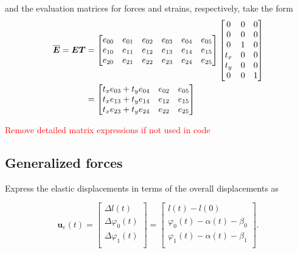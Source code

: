 and the evaluation matrices for forces and strains, respectively, take the form
%
\begin{align}
\overline{\boldsymbol{E}} = \boldsymbol{E}\boldsymbol{T} &=
\begin{bmatrix}
e_{00} & e_{01} & e_{02} & e_{03} & e_{04} & e_{05} \\
e_{10} & e_{11} & e_{12} & e_{13} & e_{14} & e_{15} \\
e_{20} & e_{21} & e_{22} & e_{23} & e_{24} & e_{25} \\
\end{bmatrix}
\begin{bmatrix}
0 & 0 & 0 \\
0 & 0 & 0 \\
0 & 1 & 0 \\
t_x & 0 & 0 \\
t_y & 0 & 0 \\
0 & 0 & 1 \\
\end{bmatrix} \notag \\
&=
\begin{bmatrix}
t_x e_{03} + t_y e_{04} & e_{02} & e_{05} \\
t_x e_{13} + t_y e_{14} & e_{12} & e_{15} \\
t_x e_{23} + t_y e_{24} & e_{22} & e_{25} \\
\end{bmatrix}
\end{align}

\textcolor{red}{Remove detailed matrix expressions if not used in code}

\newpage
\subsection{Generalized forces}

Express the elastic displacements in terms of the overall displacements as

\begin{equation}
\renewcommand\arraystretch{1.5}
\boldsymbol{u}_{e}(t) =
\begin{bmatrix}
\Delta l(t) \\
\Delta \varphi_0(t) \\
\Delta \varphi_1(t) \\ 
\end{bmatrix}
=
\begin{bmatrix}
l(t) - l(0) \\
\varphi_0(t) - \alpha(t) - \beta_0 \\
\varphi_1(t) - \alpha(t) - \beta_1 \\
\end{bmatrix}.
\end{equation}

